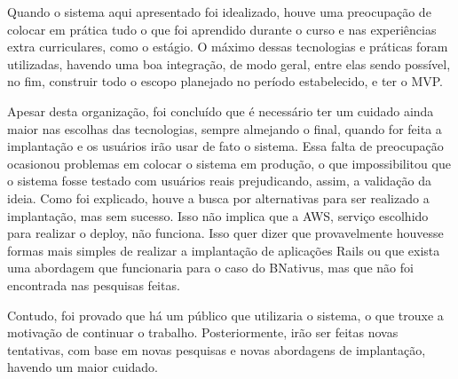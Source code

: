     Quando o sistema aqui apresentado foi idealizado, houve uma preocupação de colocar em prática tudo o que foi aprendido durante o curso e nas experiências extra curriculares, como o estágio. O máximo dessas tecnologias e práticas foram utilizadas, havendo uma boa integração, de modo geral, entre elas sendo possível, no fim, construir todo o escopo planejado no período estabelecido, e ter o MVP.
	
	Apesar desta organização, foi concluído que é necessário ter um cuidado ainda maior nas escolhas das tecnologias, sempre almejando o final, quando for feita a implantação e os usuários irão usar de fato o sistema. Essa falta de preocupação ocasionou problemas em colocar o sistema em produção, o que impossibilitou que o sistema fosse testado com usuários reais prejudicando, assim, a validação da ideia. Como foi explicado, houve a busca  por alternativas para ser realizado a implantação, mas sem sucesso. Isso não implica que a AWS, serviço escolhido para realizar o deploy, não funciona. Isso quer dizer que provavelmente houvesse formas mais simples de realizar a implantação de aplicações Rails ou que exista uma abordagem que funcionaria para o caso do BNativus, mas que não foi encontrada nas pesquisas feitas.

	Contudo, foi provado que há um público que utilizaria o sistema, o que trouxe a motivação de continuar o trabalho. Posteriormente, irão ser feitas novas tentativas, com base em novas pesquisas e novas abordagens de implantação, havendo um maior cuidado.
